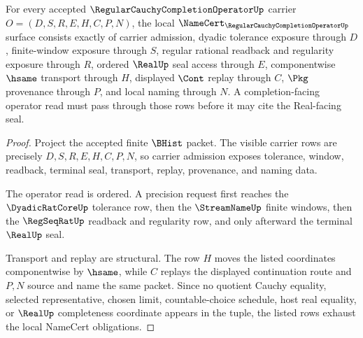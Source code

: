 \begin{theorem}
\label{thm:regular-cauchy-completion-operator-namecert-obligations}
For every accepted $\RegularCauchyCompletionOperatorUp$ carrier $O=(D,S,R,E,H,C,P,N)$, the local $\NameCert_{\RegularCauchyCompletionOperatorUp}$ surface consists exactly of carrier admission, dyadic tolerance exposure through $D$, finite-window exposure through $S$, regular rational readback and regularity exposure through $R$, ordered $\RealUp$ seal access through $E$, componentwise $\hsame$ transport through $H$, displayed $\Cont$ replay through $C$, $\Pkg$ provenance through $P$, and local naming through $N$. A completion-facing operator read must pass through those rows before it may cite the Real-facing seal.
\end{theorem}
\begin{proof}
Project the accepted finite $\BHist$ packet. The visible carrier rows are precisely $D,S,R,E,H,C,P,N$, so carrier admission exposes tolerance, window, readback, terminal seal, transport, replay, provenance, and naming data.

The operator read is ordered. A precision request first reaches the $\DyadicRatCoreUp$ tolerance row, then the $\StreamNameUp$ finite windows, then the $\RegSeqRatUp$ readback and regularity row, and only afterward the terminal $\RealUp$ seal.

Transport and replay are structural. The row $H$ moves the listed coordinates componentwise by $\hsame$, while $C$ replays the displayed continuation route and $P,N$ source and name the same packet. Since no quotient Cauchy equality, selected representative, chosen limit, countable-choice schedule, host real equality, or $\RealUp$ completeness coordinate appears in the tuple, the listed rows exhaust the local NameCert obligations.
\end{proof}

